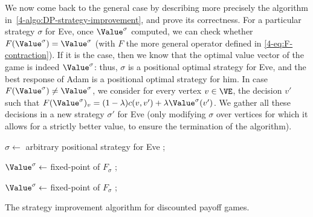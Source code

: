 \medskip

We now come back to the general case by describing more precisely the
algorithm in~\cref{4-algo:DP-strategy-improvement}, and prove its
correctness.  For a particular strategy $\sigma$ for Eve, once
$\Value^\sigma$ computed, we can check whether
$F(\Value^\sigma)=\Value^\sigma$ (with $F$ the more general operator
defined in \cref{4-eq:F-contraction}). If it is the case, then we
know that the optimal value vector of the game is indeed
$\Value^\sigma$: thus, $\sigma$ is a positional optimal strategy for
Eve, and the best response of Adam is a positional optimal strategy
for him. In case $F(\Value^\sigma)\neq\Value^\sigma$, we consider for
every vertex $v\in \VE$, the decision $v'$ such that
$F(\Value^\sigma)_v=(1-\lambda)c(v,v')+\lambda \Value^\sigma(v')$. We
gather all these decisions in a new strategy $\sigma'$ for Eve (only
modifying $\sigma$ over vertices for which it allows for a strictly
better value, to ensure the termination of the algorithm).

\begin{algorithm}

 $\sigma \leftarrow$ arbitrary positional strategy for Eve ;

 $\Value^\sigma \leftarrow $ fixed-point of $F_\sigma$ ;

 {   
 {
}

  $\Value^\sigma \leftarrow $ fixed-point of $F_\sigma$ ;

}

\Return{$(\Value^\sigma,\sigma)$}
\caption{The strategy improvement algorithm for discounted payoff games.}
\label{4-algo:DP-strategy-improvement}
\end{algorithm}

